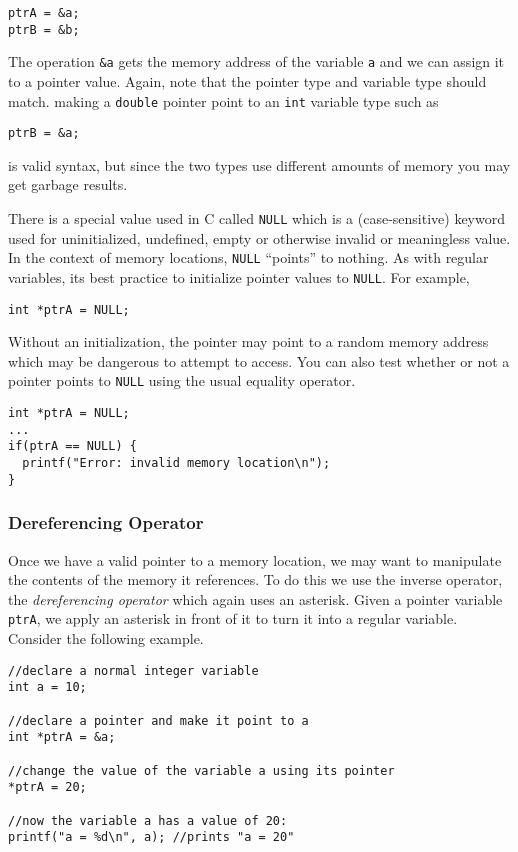 \begin{verbatim}
ptrA = &a;
ptrB = &b;
\end{verbatim}

The operation \texttt{&a} gets the memory address of the
variable \texttt{a} and we can assign it to a pointer value.
Again, note that the pointer type and variable type should match.
making a \texttt{double} pointer point to an \texttt{int}
variable type such as

\texttt{ptrB = &a;}

is valid syntax, but since the two types use different amounts of memory
you may get garbage results.

There is a special value used in C called \texttt{NULL} which
is a (case-sensitive) keyword used for uninitialized, undefined, empty or otherwise
invalid or meaningless value.  In the context of memory locations, 
\texttt{NULL} ``points'' to nothing.  As with regular variables,
its best practice to initialize pointer values to \texttt{NULL}.
For example, 

\texttt{int *ptrA = NULL;}

Without an initialization, the pointer may point to a random memory
address which may be dangerous to attempt to access.  You can also
test whether or not a pointer points to \texttt{NULL} using the 
usual equality operator.

\begin{verbatim}
int *ptrA = NULL;
...
if(ptrA == NULL) {
  printf("Error: invalid memory location\n");
}
\end{verbatim}

\subsubsection{Dereferencing Operator}

Once we have a valid pointer to a memory location, we may want
to manipulate the contents of the memory it references.  To do this
we use the inverse operator, the \emph{dereferencing operator}
which again uses an asterisk.  Given a pointer variable \texttt{ptrA}, 
we apply an asterisk in front of it to turn it into a regular variable.
Consider the following example.

\begin{verbatim}
//declare a normal integer variable
int a = 10;

//declare a pointer and make it point to a
int *ptrA = &a;

//change the value of the variable a using its pointer
*ptrA = 20;

//now the variable a has a value of 20:
printf("a = %d\n", a); //prints "a = 20"
\end{verbatim}

